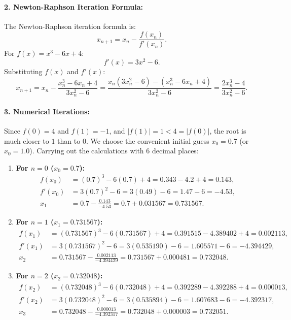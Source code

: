 \documentclass[11pt,a4paper]{article}
\begin{document}
\paragraph{2. Newton-Raphson Iteration Formula:}
The Newton-Raphson iteration formula is:
\[
x_{n+1} = x_n - \frac{f(x_n)}{f'(x_n)}.
\]
For $f(x) = x^3 - 6x + 4$:
\[
f'(x) = 3x^2 - 6.
\]
Substituting $f(x)$ and $f'(x)$:
\[
x_{n+1} = x_n - \frac{x_n^3 - 6x_n + 4}{3x_n^2 - 6} = \frac{x_n(3x_n^2 - 6) - (x_n^3 - 6x_n + 4)}{3x_n^2 - 6} = \frac{2x_n^3 - 4}{3x_n^2 - 6}.
\]

\paragraph{3. Numerical Iterations:}
Since $f(0) = 4$ and $f(1) = -1$, and $|f(1)| = 1 < 4 = |f(0)|$, the root is much closer to $1$ than to $0$. We choose the convenient initial guess $x_0 = 0.7$ (or $x_0 = 1.0$).
Carrying out the calculations with 6 decimal places:

\begin{enumerate}[label=\textbf{Iteration \arabic*:}, leftmargin=2.2cm]
    \item \textbf{For $n = 0$ ($x_0 = 0.7$):}
    \begin{align*}
    f(x_0) &= (0.7)^3 - 6(0.7) + 4 = 0.343 - 4.2 + 4 = 0.143, \\
    f'(x_0) &= 3(0.7)^2 - 6 = 3(0.49) - 6 = 1.47 - 6 = -4.53, \\
    x_1 &= 0.7 - \frac{0.143}{-4.53} = 0.7 + 0.031567 = \mathbf{0.731567}.
    \end{align*}

    \item \textbf{For $n = 1$ ($x_1 = 0.731567$):}
    \begin{align*}
    f(x_1) &= (0.731567)^3 - 6(0.731567) + 4 = 0.391515 - 4.389402 + 4 = 0.002113, \\
    f'(x_1) &= 3(0.731567)^2 - 6 = 3(0.535190) - 6 = 1.605571 - 6 = -4.394429, \\
    x_2 &= 0.731567 - \frac{0.002113}{-4.394429} = 0.731567 + 0.000481 = \mathbf{0.732048}.
    \end{align*}

    \item \textbf{For $n = 2$ ($x_2 = 0.732048$):}
    \begin{align*}
    f(x_2) &= (0.732048)^3 - 6(0.732048) + 4 = 0.392289 - 4.392288 + 4 = 0.000013, \\
    f'(x_2) &= 3(0.732048)^2 - 6 = 3(0.535894) - 6 = 1.607683 - 6 = -4.392317, \\
    x_3 &= 0.732048 - \frac{0.000013}{-4.392317} = 0.732048 + 0.000003 = \mathbf{0.732051}.
    \end{align*}
\end{enumerate}
\end{document}
